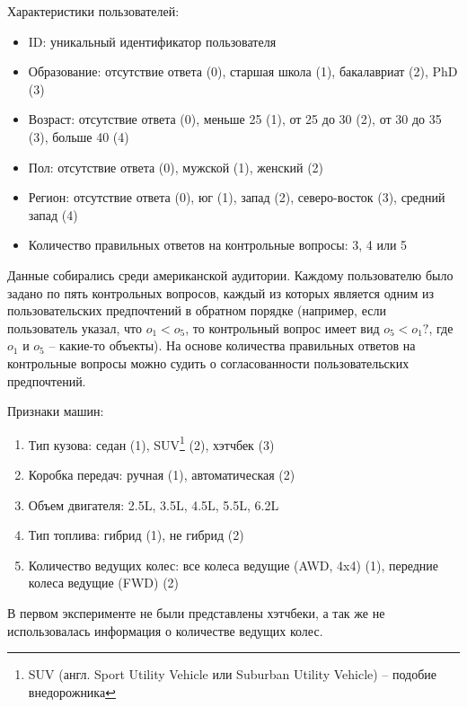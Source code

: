 		\noindent Характеристики пользователей:
		\vspace{-0.7em}
		\begin{itemize}[itemsep=-1.5mm]
			\item ID: уникальный идентификатор пользователя
			\item Образование: отсутствие ответа (0), старшая школа (1), бакалавриат (2), PhD (3)
			\item Возраст: отсутствие ответа (0), меньше 25 (1), от 25 до 30 (2), от 30 до 35 (3), больше 40 (4)
			\item Пол: отсутствие ответа (0), мужской (1), женский (2)
			\item Регион: отсутствие ответа (0), юг (1), запад (2), северо-восток (3), средний запад (4)
			\item Количество правильных ответов на контрольные вопросы: 3, 4 или 5
		\end{itemize}
		Данные собирались среди американской аудитории. Каждому пользователю было задано по пять контрольных вопросов, каждый из которых является одним из пользовательских предпочтений в обратном порядке (например, если пользователь указал, что $o_1 < o_5$, то контрольный вопрос имеет вид $o_5 < o_1?$, где $o_1$ и $o_5$ – какие-то объекты). На основе количества правильных ответов на контрольные вопросы можно судить о согласованности пользовательских предпочтений.
		
		\vspace{1em}
		
		\noindent Признаки машин:
		\vspace{-0.7em}
		\begin{enumerate}[itemsep=-1.5mm]
			\item Тип кузова: седан (1), SUV\footnote{SUV (англ. Sport Utility Vehicle или Suburban Utility Vehicle) – подобие внедорожника} (2), хэтчбек (3)
			\item Коробка передач: ручная (1), автоматическая (2)
			\item Объем двигателя: 2.5L, 3.5L, 4.5L, 5.5L, 6.2L
			\item Тип топлива: гибрид (1), не гибрид (2)
			\item Количество ведущих колес: все колеса ведущие (AWD, 4x4) (1), передние колеса ведущие (FWD) (2)
		\end{enumerate} 
		В первом эксперименте не были представлены хэтчбеки, а так же не использовалась информация о количестве ведущих колес.
	
